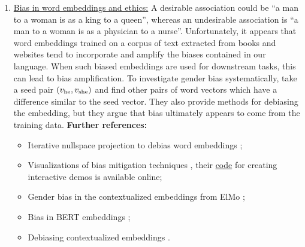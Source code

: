 \documentclass[11pt, a4paper]{amsart}
\begin{document}
\begin{enumerate}[resume]
    \item \underline{Bias in word embeddings and ethics:}
    \newline
    A desirable association could be ``a man to a woman is as a king to a queen'', whereas an undesirable association is ``a man to a woman is as a physician to a nurse''.
    Unfortunately, it appears that word embeddings trained on a corpus of text extracted from books and websites tend to incorporate and amplify the biases contained in our language.
    When such biased embeddings are used for downstream tasks, this can lead to bias amplification.
    To investigate gender bias systematically, \cite{DBLP:journals/corr/BolukbasiCZSK16a} take a seed pair $(v_\textup{he}, v_\textup{she})$ and find other pairs of word vectors which have a difference similar to the seed vector.
    They also provide methods for debiasing the embedding, but they argue that bias ultimately appears to come from the training data.
    \newline
    \textbf{Further references:}
    \begin{itemize}
        \item Iterative nullspace projection to debias word embeddings \cite{ravfogel-etal-2020-null};
        \item Visualizations of bias mitigation techniques \cite{DBLP:journals/corr/abs-2104-02797},
        their \href{https://github.com/tdavislab/verb}{code} for creating interactive demos is available online;
        \item Gender bias in the contextualized embeddings from ElMo \cite{zhao-etal-2019-gender};
        \item Bias in BERT embeddings \cite{kurita-etal-2019-measuring};
        \item Debiasing contextualized embeddings \cite{kaneko-bollegala-2021-debiasing}.
    \end{itemize}
    

\end{enumerate}
\end{document}
